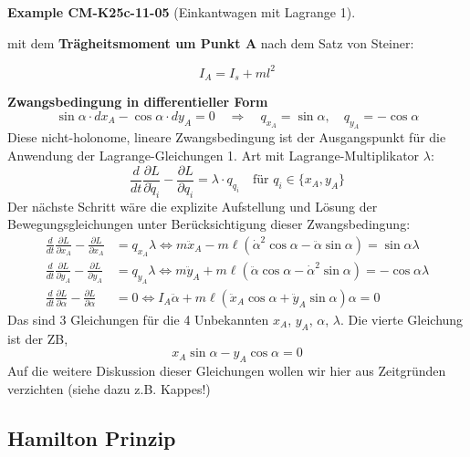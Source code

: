 \documentclass[10pt, letterpaper]{article}
\newcommand{\CustomHeading}[3]{%
  \par\medskip\noindent%
  \textbf{#1 #2} \textnormal{(#3)}.\enskip%
}
\newenvironment{EXA}[2]{\CustomHeading{Example}{#1}{#2}}{}
\begin{document}
\begin{EXA}{CM-K25c-11-05}{Einkantwagen mit Lagrange 1}
mit dem \textbf{Trägheitsmoment um Punkt A} nach dem Satz von Steiner:

\[
I_A = I_s + m l^2
\]

\textbf{Zwangsbedingung in differentieller Form}
\[
\sin\alpha \cdot dx_A - \cos\alpha \cdot dy_A = 0
\quad \Rightarrow \quad
q_{x_A} = \sin\alpha, \quad q_{y_A} = -\cos\alpha
\]
Diese nicht-holonome, lineare Zwangsbedingung ist der Ausgangspunkt für die Anwendung der Lagrange-Gleichungen 1. Art mit Lagrange-Multiplikator \( \lambda \):
\[
\frac{d}{dt} \frac{\partial L}{\partial \dot{q}_i} - \frac{\partial L}{\partial q_i} = \lambda \cdot q_{q_i}
\quad \text{für } q_i \in \{x_A, y_A\}
\]
Der nächste Schritt wäre die explizite Aufstellung und Lösung der Bewegungsgleichungen unter Berücksichtigung dieser Zwangsbedingung:
\begin{align*}
\frac{d}{dt}\frac{\partial L}{\partial x_A} - \frac{\partial L}{\partial x_A} &= q_{x_A}\lambda \Leftrightarrow m\ddot{x}_A - m\ell(\dot{\alpha}^2\cos\alpha - \ddot{\alpha}\sin\alpha) = \sin\alpha\lambda \\
\frac{d}{dt}\frac{\partial L}{\partial y_A} - \frac{\partial L}{\partial y_A} &= q_{y_A}\lambda \Leftrightarrow m\ddot{y}_A + m\ell(\ddot{\alpha}\cos\alpha - \dot{\alpha}^2\sin\alpha) = -\cos\alpha\lambda \\
\frac{d}{dt}\frac{\partial L}{\partial \alpha} - \frac{\partial L}{\partial \alpha} &= 0 \Leftrightarrow I_A\ddot{\alpha} + m\ell(\ddot{x}_A\cos\alpha + \ddot{y}_A\sin\alpha)\alpha = 0
\end{align*}
Das sind 3 Gleichungen für die 4 Unbekannten $x_A$, $y_A$, $\alpha$, $\lambda$. Die vierte Gleichung ist der ZB, 
$$x_A \sin\alpha - y_A \cos\alpha = 0$$
Auf die weitere Diskussion dieser Gleichungen wollen wir hier aus Zeitgründen verzichten (siehe dazu z.B. Kappes!)
\end{EXA}

\subsection{Hamilton Prinzip}
\end{document}
